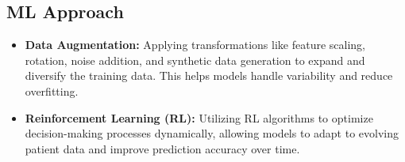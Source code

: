 \subsection*{ML Approach}
\begin{itemize}
    \item \textbf{Data Augmentation:} Applying transformations like feature scaling, rotation, noise addition, and synthetic data generation to expand and diversify the training data. This helps models handle variability and reduce overfitting.
    \item \textbf{Reinforcement Learning (RL):} Utilizing RL algorithms to optimize decision-making processes dynamically, allowing models to adapt to evolving patient data and improve prediction accuracy over time.
\end{itemize}

